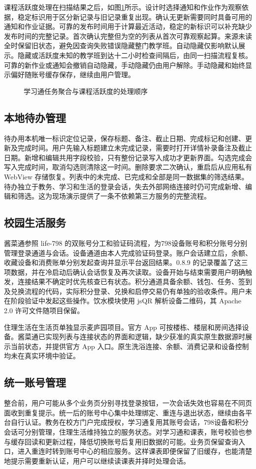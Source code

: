 课程活跃度处理在扫描结果之后，如图\ref{fig:study}所示。设计时选择通知和作业作为观察依据，稳定标识用于区分新记录与旧记录重复出现。确认无更新需要同时具备可用的通知和作业证据。可靠的发布时间用于计算最近活动，稳定的新标识可以补充缺少发布时间的完整记录。首次确认完整但为空的列表从首次可靠观察起算。来源未读全时保留旧状态，避免因查询失败错误隐藏整门教学班。自动隐藏仅影响默认展示。隐藏或活跃度未知的教学班到达十二小时检查间隔后，由同一扫描流程复核。可靠的新作业或通知会撤销自动隐藏，手动隐藏仍由用户解除。手动隐藏和始终显示偏好随账号缓存保存，继续由用户管理。

\begin{figure}[htbp]
\centering
\caption{学习通任务聚合与课程活跃度的处理顺序}\label{fig:study}
\end{figure}

\subsection{本地待办管理}
待办用本机唯一标识定位记录，保存标题、备注、截止日期、完成标记和创建、更新及完成时间。用户先输入标题建立未完成记录，需要时打开详情补录备注及截止日期。新增和编辑共用字段校验，只有整份记录写入成功才更新界面。勾选完成会写入完成时间，取消勾选则清除这一时间。删除要求二次确认，重启后从应用私有 WebView 存储恢复。列表中的未完成、已完成和全部是同一数据集的筛选结果。待办独立于教务、学习和生活的登录会话，失去外部网络连接时仍可完成新增、编辑和筛选。这为现场演示提供了一条不依赖第三方服务的完整流程。

\subsection{校园生活服务}
酱菜通参照 life-798 的双账号分工和验证码流程，为798设备账号和积分账号分别管理登录通道与会话。设备通道由本人完成验证码登录。账户会话建立后，余额、收藏设备和消费账单分别发起查询并显示平台返回结果。0.8.9 的记录覆盖了这三项数据，并在冷启动后确认会话恢复及再次读取。设备开始与结束需要用户明确触发，连接结果不确定时优先核查已有状态。积分通道具备余额、钱包、任务、签到及兑换流程的代码，实际积分登录、兑换和启停交易仍有单独的验收条件。用户未在阶段验证中发起这些操作。饮水模块使用 jsQR 解析设备二维码，其 Apache 2.0 许可文件随项目保留。

住理生活在生活页单独显示麦庐园项目。官方 App 可按楼栋、楼层和房间选择设备。酱菜通已实现列表与连接状态的界面和逻辑，缺少获准的真实原生数据源时展示当前状态，并提供官方 App 入口。原生洗浴连接、余额、消费记录和设备控制均未在真实环境中验证。

\subsection{统一账号管理}
整合前，用户可能从多个业务页分别寻找登录按钮，一次会话失效也容易在不同页面收到重复提示。统一后的账号中心集中处理绑定、重连与退出状态，继续由各平台自行认证。教务在校方门户完成授权，学习通复用其账号会话，798设备和积分会话可分别管理，住理生活维持独立的服务状态。对学习通和课表，账号校验也参与缓存回读和更新过程，降低切换账号后复用旧数据的可能。业务页保留查询入口，进入重连时转到账号中心的相应服务。这样课表即便保留了旧缓存，也能清楚地提示需要重新认证，用户可以继续读课表并择时处理会话。
